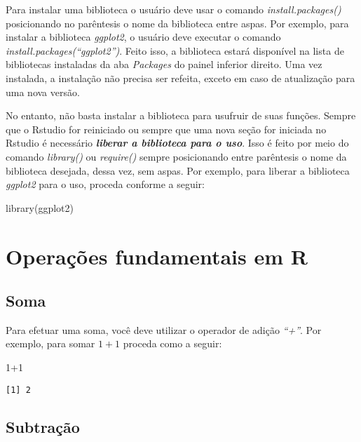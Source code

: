 \documentclass[
  letterpaper,
  DIV=11,
  numbers=noendperiod]{scrreprt}
\newenvironment{Shaded}{\begin{snugshade}}{\end{snugshade}}
\newcommand{\DecValTok}[1]{\textcolor[rgb]{0.68,0.00,0.00}{#1}}
\newcommand{\FunctionTok}[1]{\textcolor[rgb]{0.28,0.35,0.67}{#1}}
\newcommand{\NormalTok}[1]{\textcolor[rgb]{0.00,0.23,0.31}{#1}}
\newcommand{\SpecialCharTok}[1]{\textcolor[rgb]{0.37,0.37,0.37}{#1}}
\begin{document}
Para instalar uma biblioteca o usuário deve usar o comando
\emph{install.packages()} posicionando no parêntesis o nome da
biblioteca entre aspas. Por exemplo, para instalar a biblioteca
\emph{ggplot2}, o usuário deve executar o comando
\emph{install.packages(``ggplot2'')}. Feito isso, a biblioteca estará
disponível na lista de bibliotecas instaladas da aba \emph{Packages} do
painel inferior direito. Uma vez instalada, a instalação não precisa ser
refeita, exceto em caso de atualização para uma nova versão.

No entanto, não basta instalar a biblioteca para usufruir de suas
funções. Sempre que o Rstudio for reiniciado ou sempre que uma nova
seção for iniciada no Rstudio é necessário \textbf{\emph{liberar a
biblioteca para o uso}}. Isso é feito por meio do comando
\emph{library()} ou \emph{require()} sempre posicionando entre
parêntesis o nome da biblioteca desejada, dessa vez, sem aspas. Por
exemplo, para liberar a biblioteca \emph{ggplot2} para o uso, proceda
conforme a seguir:

\begin{Shaded}
\begin{Highlighting}[]
\FunctionTok{library}\NormalTok{(ggplot2)}
\end{Highlighting}
\end{Shaded}

\section{Operações fundamentais em
R}\label{operauxe7uxf5es-fundamentais-em-r}

\subsection{Soma}\label{soma}

Para efetuar uma soma, você deve utilizar o operador de adição
\emph{``+''}. Por exemplo, para somar \(1 + 1\) proceda como a seguir:

\begin{Shaded}
\begin{Highlighting}[]
\DecValTok{1}\SpecialCharTok{+}\DecValTok{1}
\end{Highlighting}
\end{Shaded}

\begin{verbatim}
[1] 2
\end{verbatim}

\subsection{Subtração}\label{subtrauxe7uxe3o}
\end{document}
